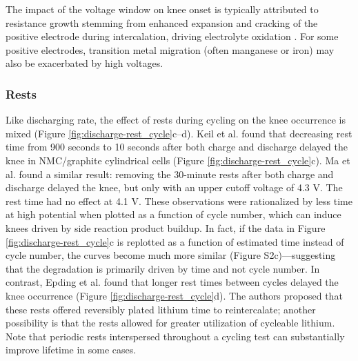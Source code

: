 \documentclass[journal=jpclcd,manuscript=article]{achemso}
\begin{document}
The impact of the voltage window on knee onset is typically attributed to resistance growth stemming from enhanced expansion and cracking of the positive electrode during intercalation, driving electrolyte oxidation \cite{broussely_main_2005, ma_editors_2019, aiken_accelerated_2020}. For some positive electrodes, transition metal migration (often manganese or iron) may also be exacerbated by high voltages. \cite{joshi_effects_2014, gilbert_transition_2017, ma_novel_2019}

\subsubsection{Rests}

Like discharging rate, the effect of rests during cycling on the knee occurrence is mixed (Figure \ref{fig:discharge-rest_cycle}c--d).
Keil et al.\cite{keil_linear_2019} found that decreasing rest time from 900 seconds to 10 seconds after both charge and discharge delayed the knee in NMC/graphite cylindrical cells (Figure \ref{fig:discharge-rest_cycle}c).
Ma et al.\cite{ma_editors_2019} found a similar result: removing the 30-minute rests after both charge and discharge delayed the knee, but only with an upper cutoff voltage of 4.3 V. The rest time had no effect at 4.1 V.
These observations were rationalized by less time at high potential when plotted as a function of cycle number, which can induce knees driven by side reaction product buildup.
In fact, if the data in Figure \ref{fig:discharge-rest_cycle}c is replotted as a function of estimated time instead of cycle number, the curves become much more similar (Figure S2c)---suggesting that the degradation is primarily driven by time and not cycle number.
In contrast, Epding et al.\cite{epding_investigation_2019} found that longer rest times between cycles delayed the knee occurrence (Figure \ref{fig:discharge-rest_cycle}d). The authors proposed that these rests offered reversibly plated lithium time to reintercalate; another possibility is that the rests allowed for greater utilization of cycleable lithium\cite{rashid_effect_2015}.
Note that periodic rests interspersed throughout a cycling test can substantially improve lifetime in some cases\cite{raj_investigation_2020}.
\end{document}
